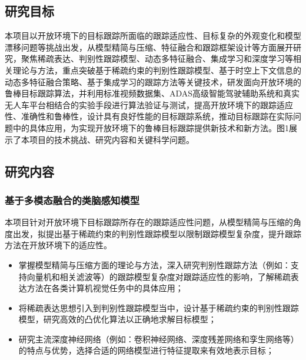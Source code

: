 \documentclass[a4paper,zihao=-4]{article}
\begin{document}
\begin{spacing}{1.3} %
	 \songti   
	
	  
	\vspace{11bp}
\end{spacing}





\subsection{研究目标}
本项目以开放环境下的目标跟踪所面临的跟踪适应性、目标复杂的外观变化和模型漂移问题等挑战出发，从模型精简与压缩、特征融合和跟踪框架设计等方面展开研究，聚焦稀疏表达、判别性跟踪模型、动态多特征融合、集成学习和深度学习等相关理论与方法，重点突破基于稀疏约束的判别性跟踪模型、基于时空上下文信息的动态多特征融合策略、基于集成学习的跟踪方法等关键技术，研发面向开放环境的鲁棒目标跟踪算法，并利用标准视频数据集、ADAS高级智能驾驶辅助系统和真实无人车平台相结合的实验手段进行算法验证与测试，提高开放环境下的跟踪适应性、准确性和鲁棒性，设计具有良好性能的目标跟踪系统，推动目标跟踪在实际问题中的具体应用，为实现开放环境下的鲁棒目标跟踪提供新技术和新方法。图1展示了本项目的技术挑战、研究内容和关键科学问题。


\subsection{研究内容}

\subsubsection{基于多模态融合的类脑感知模型}
本项目针对开放环境下目标跟踪所存在的跟踪适应性问题，从模型精简与压缩的角度出发，拟提出基于稀疏约束的判别性跟踪模型以限制跟踪模型复杂度，提升跟踪方法在开放环境下的适应性。

\begin{itemize}
	\item 掌握模型精简与压缩方面的理论与方法，深入研究判别性跟踪方法（例如：支持向量机和相关滤波等）的跟踪模型复杂度对跟踪适应性的影响，了解稀疏表达方法在各类计算机视觉任务中的具体应用；
	\item 将稀疏表达思想引入到判别性跟踪模型当中，设计基于稀疏约束的判别性跟踪模型，研究高效的凸优化算法以正确地求解目标模型；
	\item 研究主流深度神经网络（例如：卷积神经网络、深度残差网络和孪生网络等）的特点与优势，选择合适的网络模型进行特征提取来有效地表示目标；
\end{itemize}
\end{document}
